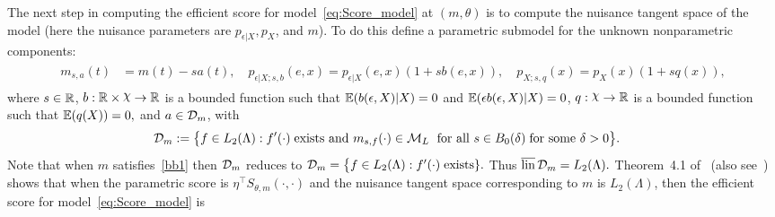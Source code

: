 {%
The next step in computing the efficient score for model~\eqref{eq:Score_model} at $(m,\theta)$ is to compute the nuisance tangent space of the model (here the nuisance parameters are $p_{\epsilon|X}, p_X$, and $m$). To do this define a parametric submodel for  the unknown nonparametric components:
\begin{align} \label{eq:nonp_path}
\begin{split}
m_{s,a}(t)&=m(t) - s a(t), \quad p_{\epsilon|X;s, b}(e, x) = p_{\epsilon|X}(e, x) (1 + s b(e, x)), \quad  p_{X; s,q}(x) =p_X(x)(1+s q(x)),
\end{split}
\end{align} where $s\in \mathbb{R}$,   $b: \R \times \rchi\to\R$ is a bounded function such that $\mathbb{E}(b(\epsilon, X) |X)=0$ and $\mathbb{E}(\epsilon b(\epsilon, X) |X)=0$,  $q: \rchi \to \R$ is a bounded function such that $\mathbb{E}(q(X))=0,$ and $a\in\mathcal{D}_m$, with 
\begin{align}\label{eq:d_def_m}
\begin{split}
\mathcal{D}_m := \big\{f \in L_2(\Lambda): f'(\cdot)\;&\text{exists and }m_{s,f}(\cdot) \in \mathcal{M}_{L}\; \text{ for all } s \in B_0(\delta)\;\text{for some }\delta >0\big\}.
\end{split}
\end{align}
  Note that when $m$ satisfies~\ref{bb1} then $\mathcal{D}_m$ reduces to $ 
 \mathcal{D}_m=  \big\{f \in L_2(\Lambda): f'(\cdot)\;\text{exists}\}.$
    Thus
     $\overline{\mathrm{lin}}\,\mathcal{D}_m = L_2(\Lambda).$
 Theorem~4.1 of~\cite{NeweyStroker93} (also see~\citet[Proposition 1]{MaZhusemi13})  shows that when  the parametric score is $\eta^\top S_{\theta,m} (\cdot, \cdot)$ and the nuisance tangent space corresponding to $m$ is $L_2(\Lambda)$, then the efficient score for model~\eqref{eq:Score_model} is 
}
